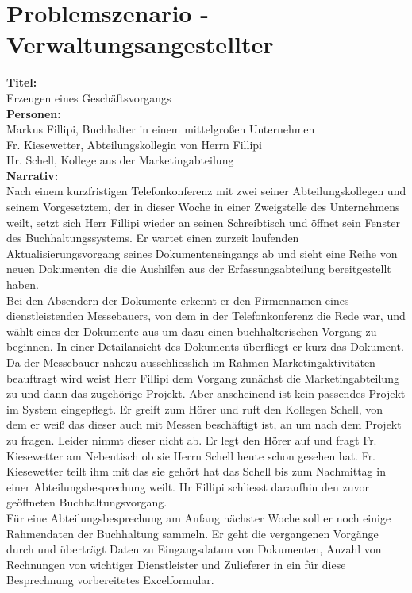 \documentclass[11pt,oneside,a4paper,notitlepage]{article}
\begin{document}
%
\section{Problemszenario - Verwaltungsangestellter}


\textbf{Titel: }\\
Erzeugen eines Geschäftsvorgangs\\
\textbf{Personen: }\\
Markus Fillipi, Buchhalter in einem mittelgroßen Unternehmen\\
Fr. Kiesewetter, Abteilungskollegin von Herrn Fillipi\\
Hr. Schell, Kollege aus der Marketingabteilung
\\[1cm]
\noindent
\textbf{Narrativ: }\\
Nach einem kurzfristigen Telefonkonferenz mit zwei seiner Abteilungskollegen und seinem Vorgesetztem, der in dieser Woche 
in einer Zweigstelle des Unternehmens weilt, setzt sich Herr Fillipi wieder an seinen Schreibtisch und öffnet sein Fenster des Buchhaltungssystems. Er wartet einen zurzeit laufenden Aktualisierungsvorgang seines Dokumenteneingangs ab und sieht eine Reihe von neuen Dokumenten die die Aushilfen aus der Erfassungsabteilung bereitgestellt haben. \\
Bei den Absendern der Dokumente erkennt er den Firmennamen eines dienstleistenden Messebauers, von dem in der Telefonkonferenz die Rede war, und wählt eines der Dokumente aus um dazu einen buchhalterischen Vorgang zu beginnen. In einer Detailansicht des Dokuments überfliegt er kurz das Dokument. Da der Messebauer nahezu ausschliesslich im Rahmen Marketingaktivitäten beauftragt wird weist Herr Fillipi dem Vorgang zunächst die Marketingabteilung zu und dann das zugehörige Projekt. Aber anscheinend ist kein passendes Projekt im System eingepflegt. Er greift zum Hörer und ruft den Kollegen Schell, von dem er weiß das dieser auch mit Messen beschäftigt ist, an um nach dem Projekt zu fragen. Leider nimmt dieser nicht ab. Er legt den Hörer auf und fragt Fr. Kiesewetter am Nebentisch ob sie Herrn Schell heute schon gesehen hat. Fr. Kiesewetter teilt ihm mit das sie gehört hat das Schell bis zum Nachmittag in einer Abteilungsbesprechung weilt. Hr Fillipi schliesst daraufhin den zuvor geöffneten Buchhaltungsvorgang.\\
Für eine Abteilungsbesprechung am Anfang nächster Woche soll er noch einige Rahmendaten der Buchhaltung sammeln. Er geht die vergangenen Vorgänge durch und überträgt Daten zu Eingangsdatum von Dokumenten, Anzahl von Rechnungen von wichtiger Dienstleister und Zulieferer in ein für diese Besprechnung vorbereitetes Excelformular.\\
\end{document}
